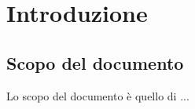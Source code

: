 \section{Introduzione}\label{section:introduzione}

\subsection{Scopo del documento}
	Lo scopo del documento è quello di ...





